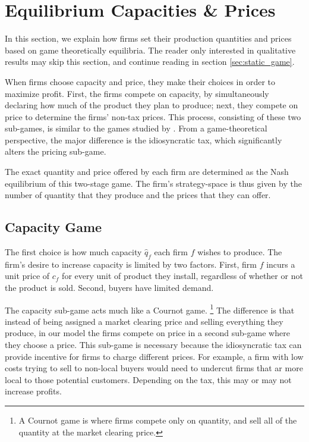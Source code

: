 \documentclass[final,3p,times,authoryear,12pt]{elsarticle}
\begin{document}
\section{Equilibrium Capacities \& Prices}
\label{sec:game_theory} 

In this section, we explain how firms set their production quantities and prices based on game theoretically equilibria. 
The reader only interested in qualitative results may skip this section, and continue reading in section \ref{sec:static_game}. 

When firms choose capacity and price, they make their choices in order to maximize profit. 
First, the firms compete on capacity, by simultaneously declaring how much of the product they plan to produce; next, they compete on price to determine the firms' non-tax prices. 
This process, consisting of these two sub-games, is similar to the games studied by \cite{kreps1983quantity}.
From a game-theoretical perspective, the major difference is the idiosyncratic tax, which significantly alters the pricing sub-game.

The exact quantity and price offered by each firm are determined as the Nash equilibrium of this two-stage game. 
The firm's strategy-space is thus given by the number of quantity that they produce and the prices that they can offer. 

\subsection{Capacity Game}
The first choice is how much capacity $\hat q_f$ each firm $f$ wishes to produce.
The firm's desire to increase capacity is limited by two factors.
First, firm $f$ incurs a unit price of $c_f$ for every unit of product they
install, regardless of whether or not the product is sold. 
Second, buyers have limited demand. 

The capacity sub-game acts much like a Cournot game.
\footnote{
A Cournot game is where firms compete only on quantity, and sell all of the quantity at the market clearing price.
} 
The difference is that instead of being assigned a
market clearing price and selling everything they produce, in our model the
firms compete on price in a second sub-game where they choose a price. This
sub-game is necessary because the idiosyncratic tax can provide incentive for
firms to charge different prices. For example, a firm with low costs trying to
sell to non-local buyers would need to undercut firms that ar more local to those potential customers. 
Depending on the tax, this may or may not increase profits. 
\end{document}
